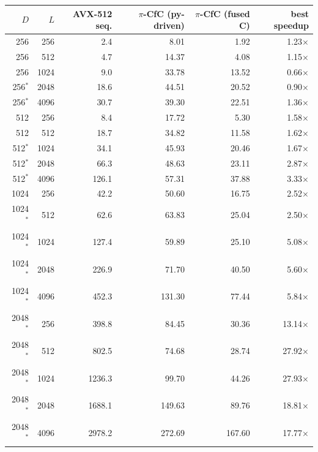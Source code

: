 \begin{tabular}{rrrrrr}
\toprule
$D$ & $L$ & AVX-512 seq. & $\pi$-CfC (py-driven) & $\pi$-CfC (fused C) & best speedup \\
\midrule
256 & 256 & 2.4 & 8.01 & 1.92 & 1.23$\times$ \\
256 & 512 & 4.7 & 14.37 & 4.08 & 1.15$\times$ \\
256 & 1024 & 9.0 & 33.78 & 13.52 & 0.66$\times$ \\
256$^{*}$ & 2048 & 18.6 & 44.51 & 20.52 & 0.90$\times$ \\
256$^{*}$ & 4096 & 30.7 & 39.30 & 22.51 & 1.36$\times$ \\
512 & 256 & 8.4 & 17.72 & 5.30 & 1.58$\times$ \\
512 & 512 & 18.7 & 34.82 & 11.58 & 1.62$\times$ \\
512$^{*}$ & 1024 & 34.1 & 45.93 & 20.46 & 1.67$\times$ \\
512$^{*}$ & 2048 & 66.3 & 48.63 & 23.11 & 2.87$\times$ \\
512$^{*}$ & 4096 & 126.1 & 57.31 & 37.88 & 3.33$\times$ \\
1024 & 256 & 42.2 & 50.60 & 16.75 & 2.52$\times$ \\
1024$^{*}$ & 512 & 62.6 & 63.83 & 25.04 & 2.50$\times$ \\
1024$^{*}$ & 1024 & 127.4 & 59.89 & 25.10 & 5.08$\times$ \\
1024$^{*}$ & 2048 & 226.9 & 71.70 & 40.50 & 5.60$\times$ \\
1024$^{*}$ & 4096 & 452.3 & 131.30 & 77.44 & 5.84$\times$ \\
2048$^{*}$ & 256 & 398.8 & 84.45 & 30.36 & 13.14$\times$ \\
2048$^{*}$ & 512 & 802.5 & 74.68 & 28.74 & 27.92$\times$ \\
2048$^{*}$ & 1024 & 1236.3 & 99.70 & 44.26 & 27.93$\times$ \\
2048$^{*}$ & 2048 & 1688.1 & 149.63 & 89.76 & 18.81$\times$ \\
2048$^{*}$ & 4096 & 2978.2 & 272.69 & 167.60 & 17.77$\times$ \\
\bottomrule
\end{tabular}
